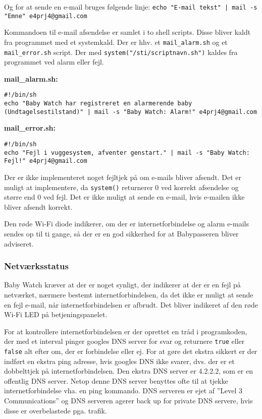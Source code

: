 Og for at sende en e-mail bruges følgende linje: \newline
\verb+echo "E-mail tekst" | mail -s "Emne" e4prj4@gmail.com+

Kommandoen til e-mail afsendelse er samlet i to shell scripts. Disse bliver kaldt fra programmet med et systemkald. Der er hhv. et \verb+mail_alarm.sh+ og et \verb+mail_error.sh+ script. Der med \verb+system("/sti/scriptnavn.sh")+ kaldes fra programmet ved alarm eller fejl.

\textbf{mail\_alarm.sh:}
\begin{lstlisting}
#!/bin/sh
echo "Baby Watch har registreret en alarmerende baby (Undtagelsestilstand)" | mail -s "Baby Watch: Alarm!" e4prj4@gmail.com
\end{lstlisting}

\textbf{mail\_error.sh:}
\begin{lstlisting}
#!/bin/sh
echo "Fejl i vuggesystem, afventer genstart." | mail -s "Baby Watch: Fejl!" e4prj4@gmail.com
\end{lstlisting}

Der er ikke implementeret noget fejltjek på om e-mails bliver afsendt. Det er muligt at implementere, da \verb+system()+ returnerer 0 ved korrekt afsendelse og større end 0 ved fejl. Det er ikke muligt at sende en e-mail, hvis e-mailen ikke bliver afsendt korrekt. 

Den røde Wi-Fi diode indikerer, om der er internetforbindelse og alarm e-mails sendes op til ti gange, så der er en god sikkerhed for at Babypasseren bliver adviseret.

\subsubsection*{Netværksstatus}

Baby Watch kræver at der er noget synligt, der indikerer at der er en fejl på netværket, nærmere bestemt internetforbindelsen, da det ikke er muligt at sende en fejl e-mail, når internetforbindelsen er afbrudt. Det bliver indikeret af den røde Wi-Fi LED på betjeningspanelet.

For at kontrollere internetforbindelsen er der oprettet en tråd i programkoden, der med et interval pinger googles DNS server for svar og returnere \verb+true+ eller \verb+false+ alt efter om, der er forbindelse eller ej. For at gøre det ekstra sikkert er der indført en ekstra ping adresse, hvis googles DNS ikke svarer, dvs. der er et dobbelttjek på internetforbindelsen. Den ekstra DNS server er 4.2.2.2, som er en offentlig DNS server. Netop denne DNS server benyttes ofte til at tjekke internetforbindelse vha. en ping kommando. DNS serveren er ejet af ''Level 3 Communications'' og DNS serveren agerer back up for private DNS servere, hvis disse er overbelastede pga. trafik.  

